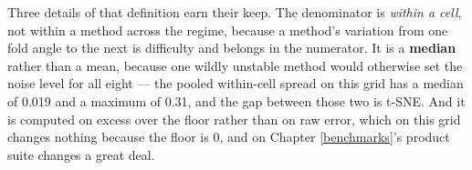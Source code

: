 \documentclass[
  british,
  a4paper,
]{book}
\newenvironment{Shaded}{\begin{snugshade}}{\end{snugshade}}
\newcommand{\AttributeTok}[1]{\textcolor[rgb]{0.13,0.29,0.53}{#1}}
\newcommand{\ConstantTok}[1]{\textcolor[rgb]{0.56,0.35,0.01}{#1}}
\newcommand{\ControlFlowTok}[1]{\textcolor[rgb]{0.13,0.29,0.53}{\textbf{#1}}}
\newcommand{\DataTypeTok}[1]{\textcolor[rgb]{0.13,0.29,0.53}{#1}}
\newcommand{\DecValTok}[1]{\textcolor[rgb]{0.00,0.00,0.81}{#1}}
\newcommand{\FunctionTok}[1]{\textcolor[rgb]{0.13,0.29,0.53}{\textbf{#1}}}
\newcommand{\NormalTok}[1]{#1}
\newcommand{\OtherTok}[1]{\textcolor[rgb]{0.56,0.35,0.01}{#1}}
\newcommand{\SpecialCharTok}[1]{\textcolor[rgb]{0.81,0.36,0.00}{\textbf{#1}}}
\begin{document}
\begin{Shaded}
\end{Shaded}

Three details of that definition earn their keep. The denominator is \emph{within a
cell}, not within a method across the regime, because a method's variation from
one fold angle to the next is difficulty and belongs in the numerator. It is a
\textbf{median} rather than a mean, because one wildly unstable method would
otherwise set the noise level for all eight --- the pooled within-cell spread on
this grid has a median of 0.019 and a maximum of
0.31, and the gap between those two is t-SNE. And it
is computed on excess over the floor rather than on raw error, which on this
grid changes nothing because the floor is 0, and on Chapter
\ref{benchmarks}'s product suite changes a great deal.
\end{document}
